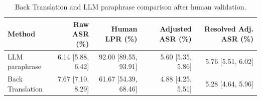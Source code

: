 \begin{table}[t]
\centering
\caption{Back Translation and LLM paraphrase comparison after human validation.}
\label{tab:bt_llm_human_adjusted}
\begin{tabular}{lrrrr}
\hline
Method & Raw ASR (\%) & Human LPR (\%) & Adjusted ASR (\%) & Resolved Adj. ASR (\%) \\
\hline
LLM paraphrase & 6.14 [5.88, 6.42] & 92.00 [89.55, 93.91] & 5.60 [5.35, 5.86] & 5.76 [5.51, 6.02] \\
Back Translation & 7.67 [7.10, 8.29] & 61.67 [54.39, 68.46] & 4.88 [4.25, 5.51] & 5.28 [4.64, 5.96] \\
\hline
\end{tabular}
\end{table}
